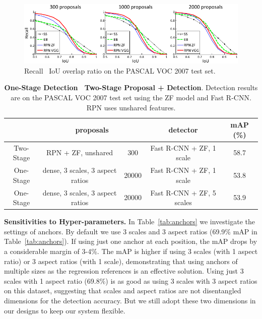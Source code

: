 \documentclass[10pt,journal,cspaper,compsoc]{IEEEtran}
\begin{document}
\begin{figure}[t]
\centering
\includegraphics[width=0.7\linewidth]{eps/recall}
\caption{Recall \vs~IoU overlap ratio on the PASCAL VOC 2007 test set.}
\label{fig:recall}
\end{figure}

\setlength{\tabcolsep}{6pt}
\renewcommand{\arraystretch}{1.1}
\begin{table}[t]
\begin{center}
\caption{\textbf{One-Stage Detection \vs~Two-Stage Proposal + Detection}. Detection results are on the PASCAL VOC 2007 test set using the ZF model and Fast R-CNN. RPN uses unshared features.}
\vspace{-1em}
\small
\begin{tabular}{c|cc|c|c}
   & \multicolumn{2}{c|}{proposals} & detector & mAP (\%) \\
  \hline\hline
  Two-Stage & RPN + ZF, unshared & 300 & Fast R-CNN + ZF, 1 scale & 58.7 \\
    \hline
  One-Stage & dense, 3 scales, 3 aspect ratios & 20000 & Fast R-CNN + ZF, 1 scale & 53.8 \\
  One-Stage & dense, 3 scales, 3 aspect ratios & 20000 & Fast R-CNN + ZF, 5 scales & 53.9 \\
\end{tabular}
\label{tab:overfeat}
\end{center}
\end{table}

\vspace{.5em}
\noindent\textbf{Sensitivities to Hyper-parameters.} In Table~\ref{tab:anchors} we investigate the settings of anchors. By default we use 3 scales and 3 aspect ratios (69.9\% mAP in Table~\ref{tab:anchors}).
If using just one anchor at each position, the mAP drops by a considerable margin of 3-4\%. The mAP is higher if using 3 scales (with 1 aspect ratio) or 3 aspect ratios (with 1 scale), demonstrating that using anchors of multiple sizes as the regression references is an effective solution. Using just 3 scales with 1 aspect ratio (69.8\%) is as good as using 3 scales with 3 aspect ratios on this dataset, suggesting that scales and aspect ratios are not disentangled dimensions for the detection accuracy. But we still adopt these two dimensions in our designs to keep our system flexible.
\end{document}
